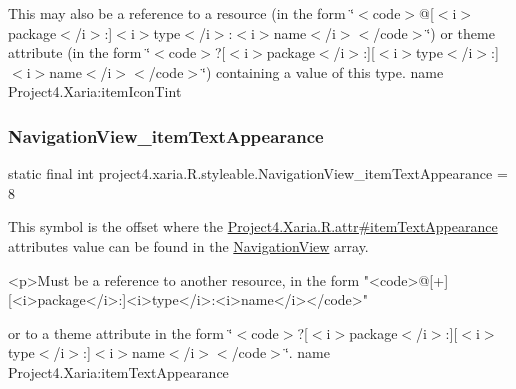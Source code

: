 This may also be a reference to a resource (in the form \char`\"{}$<$code$>$@\mbox{[}$<$i$>$package$<$/i$>$\+:\mbox{]}$<$i$>$type$<$/i$>$\+:$<$i$>$name$<$/i$>$$<$/code$>$\char`\"{}) or theme attribute (in the form \char`\"{}$<$code$>$?\mbox{[}$<$i$>$package$<$/i$>$\+:\mbox{]}\mbox{[}$<$i$>$type$<$/i$>$\+:\mbox{]}$<$i$>$name$<$/i$>$$<$/code$>$\char`\"{}) containing a value of this type.  name Project4.\+Xaria\+:item\+Icon\+Tint \mbox{\label{classproject4_1_1xaria_1_1R_1_1styleable_ac1468f6b443ff3dac67ce32e0eca086f}} 
\subsubsection{\texorpdfstring{Navigation\+View\+\_\+item\+Text\+Appearance}{NavigationView\_itemTextAppearance}}
{\footnotesize\ttfamily static final int project4.\+xaria.\+R.\+styleable.\+Navigation\+View\+\_\+item\+Text\+Appearance = 8\hspace{0.3cm}{\ttfamily [static]}}

This symbol is the offset where the \hyperlink{}{Project4.\+Xaria.\+R.\+attr\#item\+Text\+Appearance} attribute\textquotesingle{}s value can be found in the \hyperlink{classproject4_1_1xaria_1_1R_1_1styleable_a93b7138d1a19f728c4d3933a75ce23e2}{Navigation\+View} array.

\begin{DoxyVerb}      <p>Must be a reference to another resource, in the form "<code>@[+][<i>package</i>:]<i>type</i>:<i>name</i></code>"
\end{DoxyVerb}
 or to a theme attribute in the form \char`\"{}$<$code$>$?\mbox{[}$<$i$>$package$<$/i$>$\+:\mbox{]}\mbox{[}$<$i$>$type$<$/i$>$\+:\mbox{]}$<$i$>$name$<$/i$>$$<$/code$>$\char`\"{}.  name Project4.\+Xaria\+:item\+Text\+Appearance \mbox{\label{classproject4_1_1xaria_1_1R_1_1styleable_ae7444d646194867fa565bbf74485b80f}} 
